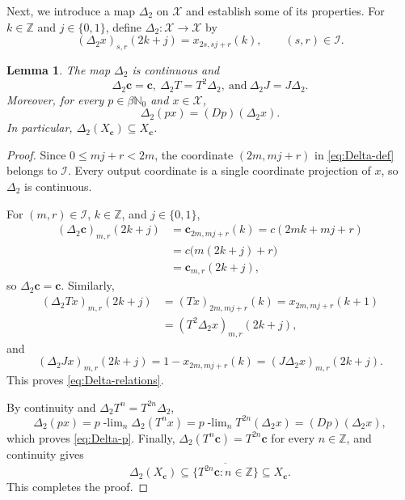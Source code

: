 \documentclass[reqno,12pt]{amsart}
\newtheorem{lemma}[thm]{Lemma}
\newcommand{\Nzero}{\mathbb N_0}
\newcommand{\bN}{\beta\Nzero}
\def \Z {\mathbb Z}
\numberwithin{equation}{section}
\begin{document}
Next, we introduce a map $\Delta_2$ on $\mathcal X$ and establish some of
its properties. For $k\in\Z$ and $j\in\{0,1\}$, define
$\Delta_2:\mathcal X\to\mathcal X$ by
	\begin{equation}\label{eq:Delta-def}
		(\Delta_2 x)_{s,r}(2k+j)=x_{2s,sj+r}(k),
		\qquad (s,r)\in\mathcal I.
	\end{equation}
\begin{lemma}\label{lem:Delta}
The map $\Delta_2$ is continuous and
	\begin{equation}\label{eq:Delta-relations}
		\Delta_2\mathbf c=\mathbf c,\
		\Delta_2 T=T^2\Delta_2,\ \text{and}\
		\Delta_2 J=J\Delta_2.
	\end{equation}
	Moreover, for every $p\in\bN$ and $x\in\mathcal X$,
	\begin{equation}\label{eq:Delta-p}
		\Delta_2(px)=(Dp)(\Delta_2 x).
	\end{equation}
In particular, $\Delta_2(X_{\mathbf c})\subseteq X_{\mathbf c}$.
\end{lemma}

\begin{proof}
Since $0\leq mj+r<2m$, the coordinate $(2m,mj+r)$ in
\eqref{eq:Delta-def} belongs to $\mathcal I$. Every output coordinate is a single
coordinate projection of $x$, so $\Delta_2$ is continuous.

For $(m,r)\in\mathcal I$, $k\in\Z$, and $j\in\{0,1\}$,
\begin{align*}
   (\Delta_2\mathbf c)_{m,r}(2k+j)
   &=\mathbf c_{2m,mj+r}(k)
   =c(2mk+mj+r)\\
   &=c\bigl(m(2k+j)+r\bigr)\\
   &=\mathbf c_{m,r}(2k+j),
\end{align*}
so $\Delta_2\mathbf c=\mathbf c$.  Similarly,
\begin{align*}
   (\Delta_2 Tx)_{m,r}(2k+j)
   &=(Tx)_{2m,mj+r}(k)
   =x_{2m,mj+r}(k+1)\\
   &=(T^2\Delta_2 x)_{m,r}(2k+j),
\end{align*}
and
\[
   (\Delta_2 Jx)_{m,r}(2k+j)
   =1-x_{2m,mj+r}(k)
   =(J\Delta_2 x)_{m,r}(2k+j).
\]
This proves \eqref{eq:Delta-relations}.

By continuity and $\Delta_2 T^n=T^{2n}\Delta_2$,
\[
   \Delta_2(px)
   =p\!\operatorname{-lim}_n\Delta_2(T^nx)
   =p\!\operatorname{-lim}_nT^{2n}(\Delta_2 x)
   =(Dp)(\Delta_2 x),
\]
which proves \eqref{eq:Delta-p}.  Finally,
$\Delta_2(T^n\mathbf c)=T^{2n}\mathbf c$ for every $n\in\Z$, and
continuity gives
\[
   \Delta_2(X_{\mathbf c})
   \subseteq\overline{\{T^{2n}\mathbf c:n\in\Z\}}
   \subseteq X_{\mathbf c}.
\] This completes the proof.
\end{proof}
\end{document}
